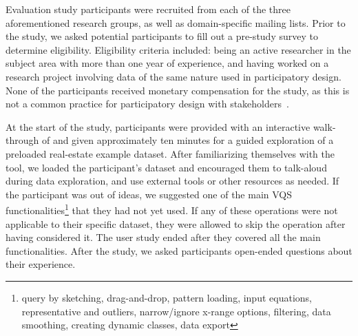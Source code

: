   \par Evaluation study participants were recruited from each of the three aforementioned research groups, as well as domain-specific mailing lists. Prior to the study, we asked potential participants to fill out a pre-study survey to determine eligibility. Eligibility criteria included: being an active researcher in the subject area with more than one year of experience, and having worked on a research project involving data of the same nature used in participatory design. None of the participants received monetary compensation for the study, as this is not a common practice for participatory design with stakeholders~\cite{Ommen2016,McNally2017}. 
  \par At the start of the study, participants were provided with an interactive walk-through of \zvpp and given approximately ten minutes for a guided exploration of a preloaded real-estate example dataset. After familiarizing themselves with the tool, we loaded the participant's dataset and encouraged them to talk-aloud during data exploration, and use external tools or other resources as needed. If the participant was out of ideas, we suggested one of the main VQS functionalities\footnote{query by sketching, drag-and-drop, pattern loading, input equations, representative and outliers, narrow/ignore x-range options, filtering, data smoothing, creating dynamic classes,  data export} that they had not yet used. If any of these operations were not applicable to their specific dataset, they were allowed to skip the operation after having considered it. The user study  ended after they covered all the main functionalities. After the study, we asked participants open-ended questions about their experience.%